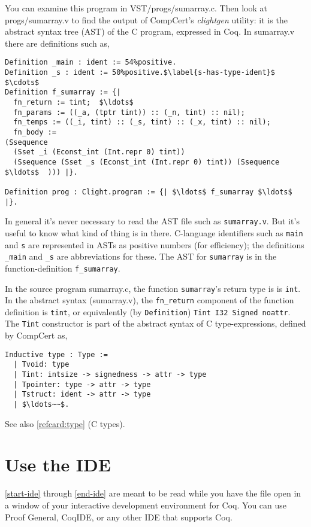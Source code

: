 \documentclass[12pt,fleqn,openany,oneside,showtrims]{memoir}
\begin{document}
You can examine this program in VST/progs/sumarray.c.
Then look at progs/sumarray.v to find the output
of CompCert's \emph{clightgen} utility:  it is the
abstract syntax tree (AST) of the C program, expressed in Coq.
In sumarray.v there are definitions such as,
\begin{lstlisting}
Definition _main : ident := 54%positive.
Definition _s : ident := 50%positive.$\label{s-has-type-ident}$
$\cdots$
Definition f_sumarray := {|
  fn_return := tint;  $\ldots$
  fn_params := ((_a, (tptr tint)) :: (_n, tint) :: nil);
  fn_temps := ((_i, tint) :: (_s, tint) :: (_x, tint) :: nil);
  fn_body :=
(Ssequence
  (Sset _i (Econst_int (Int.repr 0) tint))
  (Ssequence (Sset _s (Econst_int (Int.repr 0) tint)) (Ssequence $\ldots$  ))) |}.

Definition prog : Clight.program := {| $\ldots$ f_sumarray $\ldots$ |}.
\end{lstlisting}

In general it's never necessary to read the AST file such as
\lstinline{sumarray.v}.  But it's useful to know what kind of thing
is in there. C-language identifiers such as \lstinline{main} and \lstinline{s}
are represented in ASTs as positive numbers (for efficiency); the definitions
\lstinline{_main} and \lstinline{_s} are abbreviations for these.
The AST for \lstinline{sumarray} is in the function-definition
\lstinline{f_sumarray}.

In the source program \textsf{sumarray.c},
the function \lstinline{sumarray}'s return type is
is \lstinline{int}.
In the abstract syntax (\textsf{sumarray.v}),
the \lstinline{fn_return} component of the function definition
is \lstinline{tint}, or equivalently
(by \lstinline{Definition})
\lstinline{Tint I32 Signed noattr}.
The \lstinline{Tint} constructor is
part of the abstract syntax of  C type-expressions,
defined by CompCert as,
\begin{lstlisting}
Inductive type : Type :=
  | Tvoid: type
  | Tint: intsize -> signedness -> attr -> type
  | Tpointer: type -> attr -> type
  | Tstruct: ident -> attr -> type
  | $\ldots~~$.
\end{lstlisting}
See also \autoref{refcard:type} (C types).

\chapter{Use the IDE}
\autoref{start-ide} through \autoref{end-ide}
are meant to be read
while you have the file 
open in a window of your interactive development
environment for Coq.  You can use Proof General,
CoqIDE, or any other IDE that supports Coq.
\end{document}
